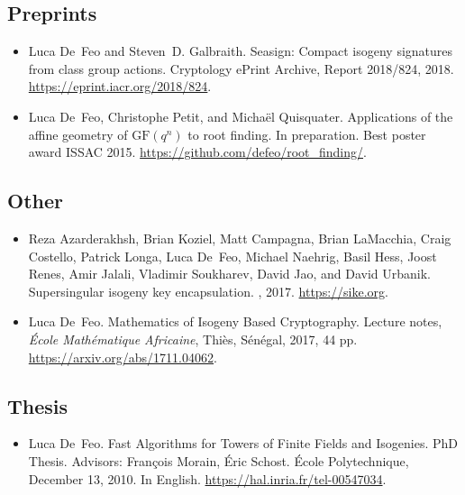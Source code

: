 \documentclass{book}
\begin{document}
\subsection*{Preprints}
\begin{itemize}
\item
Luca De~Feo and Steven~D. Galbraith.
\newblock Seasign: Compact isogeny signatures from class group actions.
\newblock Cryptology ePrint Archive, Report 2018/824, 2018.
\newblock \url{https://eprint.iacr.org/2018/824}.

\item
  Luca De~Feo, Christophe Petit, and Michaël Quisquater.
  \newblock Applications of the affine geometry of $\mathrm{GF}(q^n)$ to root finding.
  \newblock In preparation. Best poster award ISSAC 2015.
  \newblock \url{https://github.com/defeo/root_finding/}.
\end{itemize}

\subsection*{Other}
\begin{itemize}

\item
Reza Azarderakhsh, Brian Koziel, Matt Campagna, Brian LaMacchia, Craig
  Costello, Patrick Longa, Luca De~Feo, Michael Naehrig, Basil Hess, Joost
  Renes, Amir Jalali, Vladimir Soukharev, David Jao, and David Urbanik.
  \newblock Supersingular isogeny key encapsulation.
  , 2017.
  \newblock \url{https://sike.org}.

\item
  Luca De~Feo.
  \newblock Mathematics of Isogeny Based Cryptography.
  \newblock Lecture notes, {\em École Mathématique Africaine}, Thiès, Sénégal, 2017, 44 pp.
  \newblock \url{https://arxiv.org/abs/1711.04062}.
\end{itemize}

\subsection*{Thesis}
\begin{itemize}
\item Luca De~Feo.
\newblock Fast Algorithms for Towers of Finite Fields and Isogenies.
\newblock PhD Thesis. Advisors: François Morain, Éric Schost.
\newblock École Polytechnique, December 13, 2010. In English.
\newblock \url{https://hal.inria.fr/tel-00547034}.
\end{itemize}
\end{document}
